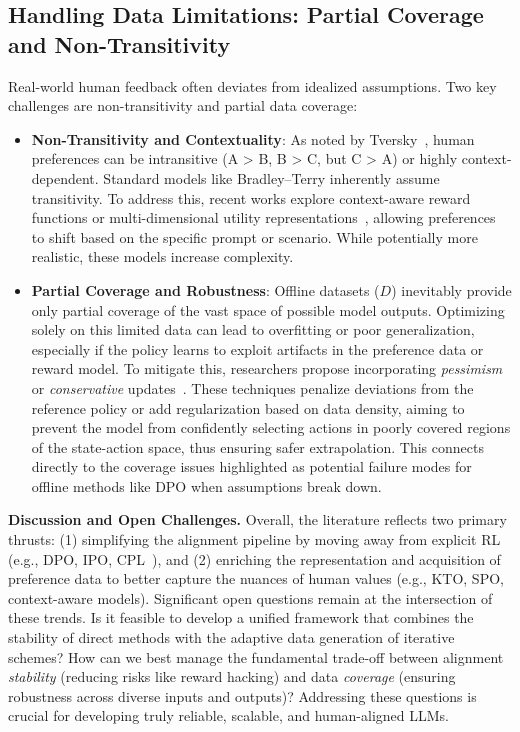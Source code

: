 \documentclass[a4paper,oneside,10pt,ngerman,english]{scrartcl}
\begin{document}
\subsection{Handling Data Limitations: Partial Coverage and Non-Transitivity}
Real-world human feedback often deviates from idealized assumptions. Two key challenges are non-transitivity and partial data coverage:
\begin{itemize}
    \item \textbf{Non-Transitivity and Contextuality}: As noted by Tversky~\cite{bib:Tversky1969}, human preferences can be intransitive (A > B, B > C, but C > A) or highly context-dependent. Standard models like Bradley--Terry inherently assume transitivity. To address this, recent works explore context-aware reward functions or multi-dimensional utility representations~\cite{bib:yang2024contextual}, allowing preferences to shift based on the specific prompt or scenario. While potentially more realistic, these models increase complexity.
    \item \textbf{Partial Coverage and Robustness}: Offline datasets (\(D\)) inevitably provide only partial coverage of the vast space of possible model outputs. Optimizing solely on this limited data can lead to overfitting or poor generalization, especially if the policy learns to exploit artifacts in the preference data or reward model. To mitigate this, researchers propose incorporating \emph{pessimism} or \emph{conservative} updates~\cite{bib:calandriello2024ipo-md}. These techniques penalize deviations from the reference policy or add regularization based on data density, aiming to prevent the model from confidently selecting actions in poorly covered regions of the state-action space, thus ensuring safer extrapolation. This connects directly to the coverage issues highlighted as potential failure modes for offline methods like DPO when assumptions break down.
\end{itemize}

\medskip
\noindent
\textbf{Discussion and Open Challenges.} Overall, the literature reflects two primary thrusts: (1) simplifying the alignment pipeline by moving away from explicit RL (e.g., DPO, IPO, CPL~\cite{bib:zhao2023contrastive}), and (2) enriching the representation and acquisition of preference data to better capture the nuances of human values (e.g., KTO, SPO, context-aware models). Significant open questions remain at the intersection of these trends. Is it feasible to develop a unified framework that combines the stability of direct methods with the adaptive data generation of iterative schemes? How can we best manage the fundamental trade-off between alignment \emph{stability} (reducing risks like reward hacking) and data \emph{coverage} (ensuring robustness across diverse inputs and outputs)? Addressing these questions is crucial for developing truly reliable, scalable, and human-aligned LLMs.
\end{document}
